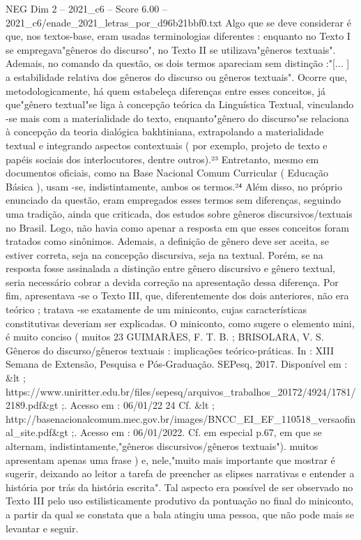 \begin{textsample}{NEG Dim 2 – 2021\_c6 – Score 6.00 – 2021\_c6/enade\_2021\_letras\_por\_d96b21bbf0.txt}
Algo que se deve considerar é que, nos textos-base, eram usadas terminologias diferentes : enquanto no Texto I se empregava"gêneros do discurso", no Texto II se utilizava"gêneros textuais".
Ademais, no comando da questão, os dois termos apareciam sem distinção :"[... ] a estabilidade relativa dos gêneros do discurso ou gêneros textuais".
Ocorre que, metodologicamente, há quem estabeleça diferenças entre esses conceitos, já que"gênero textual"se liga à concepção teórica da Linguística Textual, vinculando -se mais com a materialidade do texto, enquanto"gênero do discurso"se relaciona à concepção da teoria dialógica bakhtiniana, extrapolando a materialidade textual e integrando aspectos contextuais ( por exemplo, projeto de texto e papéis sociais dos interlocutores, dentre outros).²³ Entretanto, mesmo em documentos oficiais, como na Base Nacional Comum Curricular ( Educação Básica ), usam -se, indistintamente, ambos os termos.²⁴ Além disso, no próprio enunciado da questão, eram empregados esses termos sem diferenças, seguindo uma tradição, ainda que criticada, dos estudos sobre gêneros discursivos/textuais no Brasil.
Logo, não havia como apenar a resposta em que esses conceitos foram tratados como sinônimos.
Ademais, a definição de gênero deve ser aceita, se estiver correta, seja na concepção discursiva, seja na textual.
Porém, se na resposta fosse assinalada a distinção entre gênero discursivo e gênero textual, seria necessário cobrar a devida correção na apresentação dessa diferença.
Por fim, apresentava -se o Texto III, que, diferentemente dos dois anteriores, não era teórico ; tratava -se exatamente de um miniconto, cujas características constitutivas deveriam ser explicadas.
O miniconto, como sugere o elemento mini, é muito conciso ( muitos 23 GUIMARÃES, F.
T.
B. ; BRISOLARA, V.
S.
Gêneros do discurso/gêneros textuais : implicações teórico-práticas.
In : XIII Semana de Extensão, Pesquisa e Pós-Graduação.
SEPesq, 2017.
Disponível em : \&lt ; https://www.uniritter.edu.br/files/sepesq/arquivos\_trabalhos\_20172/4924/1781/2189.pdf\&gt ;.
Acesso em : 06/01/22 24 Cf. \&lt ; http://basenacionalcomum.mec.gov.br/images/BNCC\_EI\_EF\_110518\_versaofinal\_site.pdf\&gt ;.
Acesso em : 06/01/2022.
Cf. em especial p.67, em que se alternam, indistintamente,"gêneros discursivos/gêneros textuais"). muitos apresentam apenas uma frase ) e, nele,"muito mais importante que mostrar é sugerir, deixando ao leitor a tarefa de preencher as elipses narrativas e entender a história por trás da história escrita".
Tal aspecto era possível de ser observado no Texto III pelo uso estilisticamente produtivo da pontuação no final do miniconto, a partir da qual se constata que a bala atingiu uma pessoa, que não pode mais se levantar e seguir.

\end{textsample}
